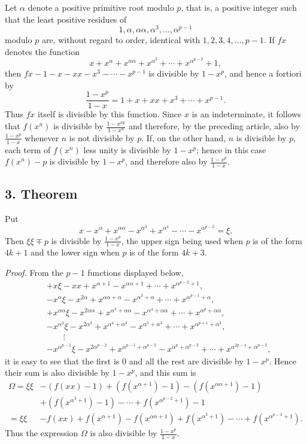 \documentclass[12pt]{article}
\begin{document}
Let $\alpha$ denote a positive primitive root modulo $p$, that is, a positive integer such that the least positive residues of
\[
1,\alpha,\alpha\alpha,\alpha^3,\ldots,\alpha^{p-1}
\]
modulo $p$ are, without regard to order, identical with $1,2,3,4,\ldots,p-1$. If $fx$ denotes the function
\[
x+x^\alpha+x^{\alpha\alpha}+x^{\alpha^3}+\cdots+x^{\alpha^{p-2}}+1,
\]
then $fx-1-x-xx-x^3-\cdots-x^{p-1}$ is divisible by $1-x^p$, and hence a fortiori by
\[
\frac{1-x^p}{1-x}=1+x+xx+x^3+\cdots+x^{p-1}.
\]
Thus $fx$ itself is divisible by this function. Since $x$ is an indeterminate, it follows that $f(x^n)$ is divisible by $\frac{1-x^{np}}{1-x^n}$ and therefore, by the preceding article, also by $\frac{1-x^p}{1-x}$ whenever $n$ is not divisible by $p$. If, on the other hand, $n$ is divisible by $p$, each term of $f(x^n)$ less unity is divisible by $1-x^p$; hence in this case $f(x^n)-p$ is divisible by $1-x^p$, and therefore also by $\frac{1-x^p}{1-x}$.

\subsection*{3. Theorem}

Put
\[
x-x^\alpha+x^{\alpha\alpha}-x^{\alpha^3}+x^{\alpha^4}-\cdots-x^{\alpha^{p-2}}=\xi.
\]
Then $\xi\xi\mp p$ is divisible by $\frac{1-x^p}{1-x}$, the upper sign being used when $p$ is of the form $4k+1$ and the lower sign when $p$ is of the form $4k+3$.

\emph{Proof.} From the $p-1$ functions displayed below,
\[
\begin{aligned}
&+x\xi-xx+x^{\alpha+1}-x^{\alpha\alpha+1}+\cdots+x^{\alpha^{p-2}+1},\\
&-x^\alpha\xi-x^{2\alpha}+x^{\alpha\alpha+\alpha}-x^{\alpha^3+\alpha}+\cdots+x^{\alpha^{p-1}+\alpha},\\
&+x^{\alpha\alpha}\xi-x^{2\alpha\alpha}+x^{\alpha^3+\alpha\alpha}-x^{\alpha^4+\alpha\alpha}+\cdots+x^{\alpha^p+\alpha\alpha},\\
&-x^{\alpha^3}\xi-x^{2\alpha^3}+x^{\alpha^4+\alpha^3}-x^{\alpha^5+\alpha^3}+\cdots+x^{\alpha^{p+1}+\alpha^3},\\
&\qquad\vdots\\
&-x^{\alpha^{p-2}}\xi-x^{2\alpha^{p-2}}+x^{\alpha^{p-1}+\alpha^{p-2}}-x^{\alpha^p+\alpha^{p-2}}+\cdots+x^{\alpha^{2p-4}+\alpha^{p-2}},
\end{aligned}
\]
it is easy to see that the first is $0$ and all the rest are divisible by $1-x^p$. Hence their sum is also divisible by $1-x^p$, and this sum is
\[
\begin{aligned}
\Omega=\xi\xi
&-(f(xx)-1)+(f(x^{\alpha+1})-1)-(f(x^{\alpha\alpha+1})-1)\\
&+(f(x^{\alpha^3+1})-1)-\cdots+f(x^{\alpha^{p-2}+1})-1\\
=\xi\xi
&-f(xx)+f(x^{\alpha+1})-f(x^{\alpha\alpha+1})
 +f(x^{\alpha^3+1})-\cdots+f(x^{\alpha^{p-2}+1}).
\end{aligned}
\]
Thus the expression $\Omega$ is also divisible by $\frac{1-x^p}{1-x}$.
\end{document}
